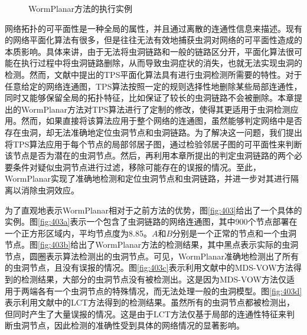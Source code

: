 \begin{figure}[t]
  \centering
  \hspace{0.5em}%
  \hspace{0.5em}%
  \hspace{0.5em}%
  \caption{WormPlanar方法的执行实例}
  \label{fig:404}
\end{figure}
网络拓扑的可平面性是一种全局的属性，并且通过离散的连通性信息来描述。现有的网络平面化算法有很多，但是往往无法有效地捕获虫洞对网络的可平面性造成的本质影响。具体来讲，由于无法将虫洞链路和一般的链路区分开，平面化算法很可能在执行过程中将虫洞链路删除，从而导致虫洞症状的消失，也就无法实现虫洞的检测。然而，文献中提出的TPS平面化算法具有进行虫洞检测所需要的特性。对于任意给定的网络连通图，TPS算法按照一定的规则选择性地删除某些局部连通性，同时又能够保留全局的拓扑特征，比如保证了较长的虫洞链路不会被删除。本章提出的WormPlanar方法对TPS算法进行了定制的修改，使得其更适用于虫洞检测应用。然而，如果直接将该算法应用于整个网络的连通图，虽然能够判定网络中是否存在虫洞，却无法准确地定位虫洞节点和虫洞链路。为了解决这一问题，我们提出将TPS算法应用于每个节点的局部邻居子图，通过检验邻居子图的可平面性来判断该节点是否为潜在的虫洞节点。然后，再利用本章所提出的判定虫洞链路的两个必要条件对疑似虫洞节点进行过滤，移除可能存在的误报的情况。至此，WormPlanar实现了准确地检测和定位虫洞节点和虫洞链路，并进一步对其进行隔离以消除虫洞效应。

为了直观地表示WormPlanar相对于之前方法的优势，图\ref{fig:403}给出了一个具体的实例。图\ref{fig:403a}表示一个包含了虫洞链路的网络连通图，其中900个节点部署在一个正方形区域内，平均节点度为8.85。$A$和$B$分别是一个正常的节点和一个虫洞节点。图\ref{fig:403b}给出了WormPlanar方法的检测结果，其中黑点表示实际的虫洞节点，圆圈表示算法检测出的虫洞节点。可见，WormPlanar准确地检测出了所有的虫洞节点，且没有误报的情况。图\ref{fig:403c}表示利用文献中的MDS-VOW方法得到的检测结果，大部分的虫洞节点没有被检测出。这是因为MDS-VOW方法仅适用于两端各有一个虫洞节点的特殊情况，而无法处理一般的虫洞模型。图\ref{fig:403d}表示利用文献中的LCT方法得到的检测结果。虽然所有的虫洞节点都被检测出，但同时产生了大量误报的情况。这是由于LCT方法仅基于局部的连通性特征来判断虫洞节点，因此检测的准确性受到具体的网络情况的显著影响。

